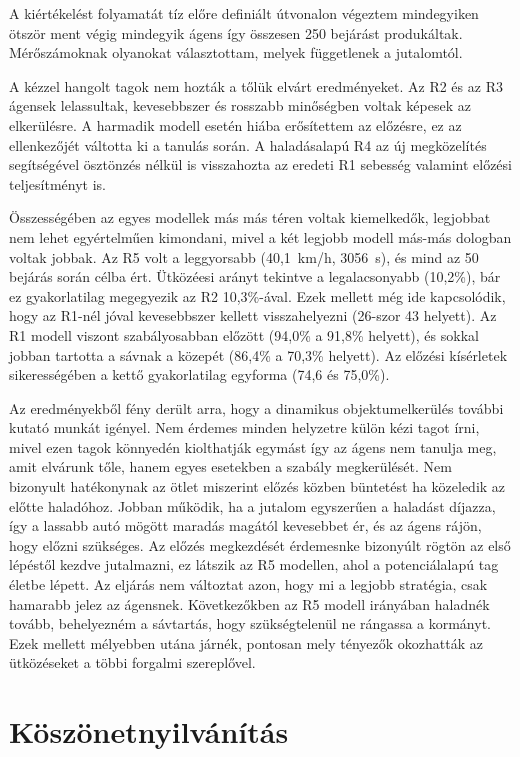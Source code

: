 \documentclass[a4paper,12pt,oneside]{article}
\begin{document}
A kiértékelést folyamatát tíz előre definiált útvonalon végeztem 
mindegyiken ötször ment végig mindegyik ágens így összesen 250 bejárást produkáltak.
Mérőszámoknak olyanokat választottam, melyek függetlenek a jutalomtól. 

A kézzel hangolt tagok nem hozták a tőlük elvárt eredményeket. 
Az R2 és az R3 ágensek lelassultak, kevesebbszer és rosszabb minőségben voltak képesek az 
elkerülésre. A harmadik modell esetén hiába erősítettem az előzésre, ez az ellenkezőjét
váltotta ki a tanulás során. 
A haladásalapú R4 az új megközelítés segítségével ösztönzés nélkül is visszahozta az
eredeti R1 sebesség valamint előzési teljesítményt is.

Összességében az egyes modellek más más téren voltak kiemelkedők, legjobbat nem lehet egyértelműen kimondani, mivel a két legjobb modell más-más
dologban voltak jobbak. 
Az R5 volt a leggyorsabb (40,1~km/h, 3056~s), és mind az 50 bejárás során
célba ért. Ütközéesi arányt tekintve a legalacsonyabb (10,2\%), bár ez gyakorlatilag megegyezik az R2 10,3\%-ával. 
Ezek mellett még ide kapcsolódik, hogy az R1-nél jóval kevesebbszer kellett visszahelyezni (26-szor
43 helyett).
Az R1 modell viszont szabályosabban előzött (94,0\% a 91,8\% helyett), és sokkal
jobban tartotta a sávnak a közepét (86,4\% a 70,3\% helyett). 
Az előzési kísérletek sikerességében a
kettő gyakorlatilag egyforma (74,6 és 75,0\%). 

Az eredményekből fény derült arra, hogy a dinamikus objektumelkerülés további kutató munkát igényel. 
Nem érdemes minden helyzetre külön kézi tagot írni, mivel ezen tagok könnyedén kiolthatják egymást
így az ágens nem tanulja meg, amit elvárunk tőle, hanem egyes esetekben a szabály megkerülését. 
Nem bizonyult hatékonynak az ötlet miszerint előzés közben büntetést ha közeledik az előtte haladóhoz.
Jobban működik, ha a jutalom egyszerűen a haladást díjazza, így a lassabb autó mögött maradás magától
kevesebbet ér, és az ágens rájön, hogy előzni szükséges. 
Az előzés megkezdését érdemesnke bizonyúlt rögtön az első lépéstől kezdve jutalmazni, ez látszik az R5 modellen, ahol a potenciálalapú tag életbe lépett. 
Az eljárás nem változtat azon, hogy mi a legjobb stratégia, csak hamarabb jelez az ágensnek. 
Következőkben az R5 modell irányában haladnék tovább, behelyezném a sávtartás, hogy szükségtelenül ne rángassa a kormányt.
Ezek mellett mélyebben utána járnék, pontosan mely tényezők okozhatták
az ütközéseket a többi forgalmi szereplővel.

\section{Köszönetnyilvánítás}
\end{document}
